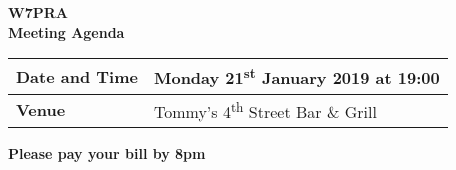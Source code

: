 \documentclass[letter,11pt]{extarticle}
\begin{document}
	\thispagestyle{empty}
	
	\begin{center}
		\textbf{W7PRA\\Meeting Agenda}
		\vspace{0.33cm}
	\end{center}
	
	\begin{center}
		\begin{tabular}{| m{3.0cm} | m{7.5cm} |} \hline
			\textbf{Date and Time} & Monday 21\textsuperscript{st} January 2019 at 19:00 \\ \hline
			\textbf{Venue} & Tommy's 4\textsuperscript{th} Street Bar \& Grill \\ \hline
				\end{tabular}
	\end{center}
	
	\begin{center}
		\textbf{Please pay your bill by 8pm}
	\end{center}
	
\end{document}
